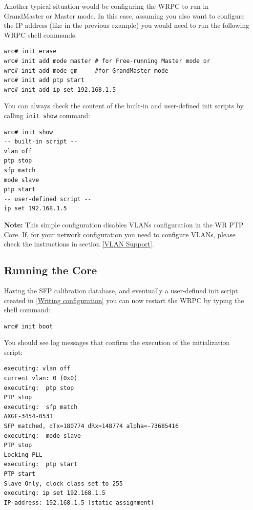 \documentclass[a4paper, 12pt]{article}
\renewcommand{\_}{\underscore\allowbreak}
\begin{document}
Another typical situation would be configuring the WRPC to run in GrandMaster or
Master mode. In this case, assuming you also want to configure the IP address
(like in the previous example) you would need to run the following WRPC shell
commands:
\begin{lstlisting}
wrc# init erase
wrc# init add mode master # for Free-running Master mode or
wrc# init add mode gm     #for GrandMaster mode
wrc# init add ptp start
wrc# init add ip set 192.168.1.5
\end{lstlisting}

You can always check the content of the built-in and user-defined init scripts
by calling \texttt{init show} command:
\begin{lstlisting}
wrc# init show
-- built-in script --
vlan off
ptp stop
sfp match
mode slave
ptp start
-- user-defined script --
ip set 192.168.1.5
\end{lstlisting}

\noindent\textbf{Note:} This simple configuration disables VLANs configuration
in the WR PTP Core. If, for your network configuration you need to configure
VLANs, please check the instructions in section \ref{VLAN Support}.

\subsection{Running the Core}
\label{Running the Core}

Having the SFP calibration database, and eventually a user-defined init script
created in \ref{Writing configuration} you can now restart the WRPC by typing
the shell command:

\begin{lstlisting}
wrc# init boot
\end{lstlisting}

You should see log messages that confirm the execution of the initialization
script:
\begin{minipage}{\textwidth}
\begin{lstlisting}
executing: vlan off
current vlan: 0 (0x0)
executing:  ptp stop
PTP stop
executing:  sfp match
AXGE-3454-0531  
SFP matched, dTx=180774 dRx=148774 alpha=-73685416
executing:  mode slave
PTP stop
Locking PLL
executing:  ptp start
PTP start
Slave Only, clock class set to 255
executing: ip set 192.168.1.5
IP-address: 192.168.1.5 (static assignment)
\end{lstlisting}
\end{minipage}
\end{document}
